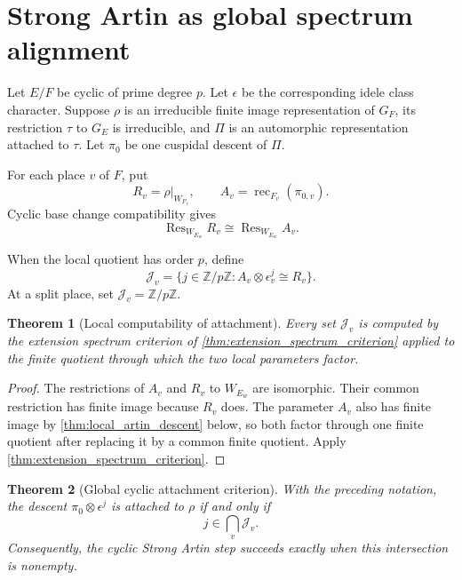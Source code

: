 \documentclass{aomart}
\newtheorem{theorem}{Theorem}[section]
\theoremstyle{definition}
\theoremstyle{remark}
\newcommand{\ZZ}{\mathbb Z}
\newcommand{\Res}{\operatorname{Res}}
\newcommand{\rec}{\operatorname{rec}}
\newcommand{\calJ}{\mathcal J}
\begin{document}
\section{Strong Artin as global spectrum alignment}\label{sec:global_alignment}

Let \(E/F\) be cyclic of prime degree \(p\). Let \(\epsilon\) be the corresponding idele class character. Suppose \(\rho\) is an irreducible finite image representation of \(G_F\), its restriction \(\tau\) to \(G_E\) is irreducible, and \(\Pi\) is an automorphic representation attached to \(\tau\). Let \(\pi_0\) be one cuspidal descent of \(\Pi\).

For each place \(v\) of \(F\), put
\[
 R_v=\rho|_{W_{F_v}},
 \qquad
 A_v=\rec_{F_v}(\pi_{0,v}).
\]
Cyclic base change compatibility gives
\[
 \Res_{W_{E_w}}R_v
 \cong
 \Res_{W_{E_w}}A_v.
\]

\begin{definition}\label{def:local_attachment_set}
When the local quotient has order \(p\), define
\[
 \calJ_v
 =
 \{j\in\ZZ/p\ZZ:
 A_v\otimes\epsilon_v^j\cong R_v\}.
\]
At a split place, set \(\calJ_v=\ZZ/p\ZZ\).
\end{definition}

\begin{theorem}[Local computability of attachment]\label{thm:local_attachment_spectrum}
Every set \(\calJ_v\) is computed by the extension spectrum criterion of \cref{thm:extension_spectrum_criterion} applied to the finite quotient through which the two local parameters factor.
\end{theorem}

\begin{proof}
The restrictions of \(A_v\) and \(R_v\) to \(W_{E_w}\) are isomorphic. Their common restriction has finite image because \(R_v\) does. The parameter \(A_v\) also has finite image by \cref{thm:local_artin_descent} below, so both factor through one finite quotient after replacing it by a common finite quotient. Apply \cref{thm:extension_spectrum_criterion}.
\end{proof}

\begin{theorem}[Global cyclic attachment criterion]\label{thm:global_attachment_criterion}
With the preceding notation, the descent \(\pi_0\otimes\epsilon^j\) is attached to \(\rho\) if and only if
\[
 \boxed{
 j\in\bigcap_v\calJ_v.
 }
\]
Consequently, the cyclic Strong Artin step succeeds exactly when this intersection is nonempty.
\end{theorem}
\end{document}

